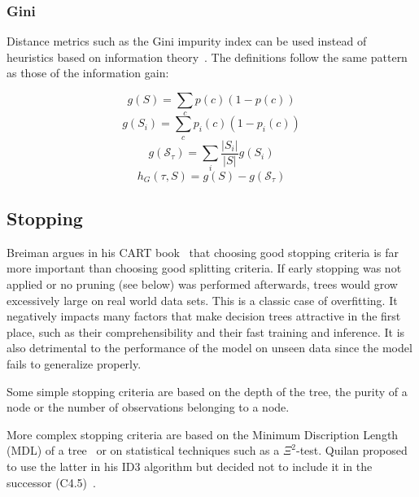 \subsubsection{Gini}
Distance metrics such as the Gini impurity index can be used instead of heuristics based on information theory~\cite{cart}. The definitions follow the same pattern as those of the information gain:

\begin{equation}
    g(S) = \sum_c p(c)(1 - p(c))
\end{equation}
\begin{equation}
    g(S_i) = \sum_c p_i(c)(1-p_i(c))
\end{equation}
\begin{equation}
    g(\mathcal{S}_\tau) = \sum_i \frac{|S_i|}{|S|} g(S_i)
\end{equation}
\begin{equation}
    h_G(\tau, S) = g(S) - g(\mathcal{S}_\tau)
\end{equation}


\subsection{Stopping}
Breiman argues in his CART book~\cite{cart} that choosing good stopping criteria is far more important than choosing good splitting criteria. If early stopping was not applied or no pruning (see below) was performed afterwards, trees would grow excessively large on real world data sets. This is a classic case of overfitting. It negatively impacts many factors that make decision trees attractive in the first place, such as their comprehensibility and their fast training and inference. It is also detrimental to the performance of the model on unseen data since the model fails to generalize properly.

Some simple stopping criteria are based on the depth of the tree, the purity of a node or the number of observations belonging to a node. 

More complex stopping criteria are based on the Minimum Discription Length (MDL) of a tree~\cite{mdlstopping} or on statistical techniques such as a $\Xi^2$-test. Quilan proposed to use the latter in his ID3 algorithm but decided not to include it in the successor (C4.5)~\cite{id3ter, c45}.

